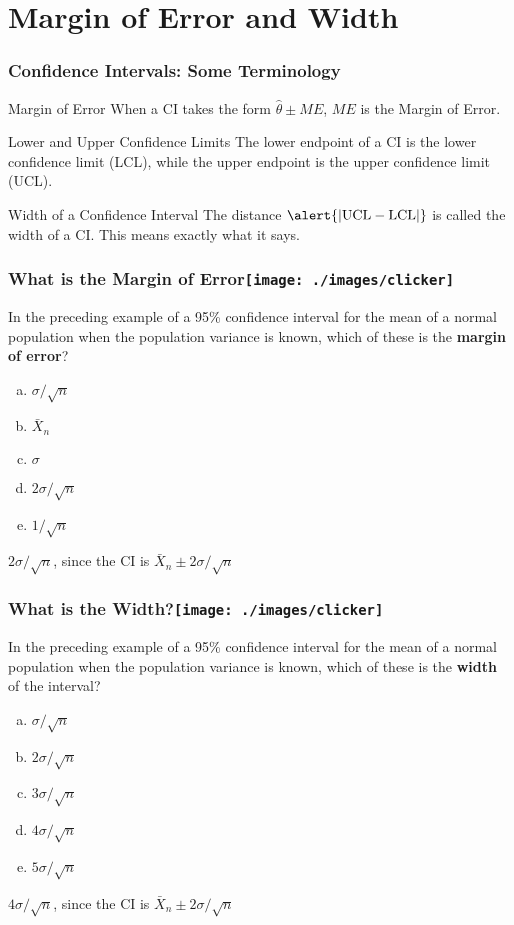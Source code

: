 \section{Margin of Error and Width}
\begin{frame}
\frametitle{Confidence Intervals: Some Terminology}
\begin{block}{Margin of Error}
When a CI takes the form $\widehat{\theta}\pm ME$, $ME$ is the Margin of Error. 
\end{block}
\pause
\begin{block}{Lower and Upper Confidence Limits}
The lower endpoint of a CI is the \alert{lower confidence limit (LCL)}, while the upper endpoint is the \alert{upper confidence limit (UCL)}.
\end{block}
\pause
\begin{block}{Width of a Confidence Interval}
The distance $\alert{|\mbox{UCL} - \mbox{LCL}|}$ is called the \alert{width} of a CI. This means exactly what it says. 
\end{block}

\end{frame}
\begin{frame}
\frametitle{What is the Margin of Error\hfill \texttt{[image: ./images/clicker]}}
In the preceding example of a  95\% confidence interval for the mean of a normal population when the population variance is known, which of these is the \textbf{margin of error}?
	\begin{enumerate}[(a)]
		\item $\sigma/\sqrt{n}$
		\item $\bar{X}_n$
		\item $\sigma$
		\item $2\sigma/\sqrt{n}$
		\item $1/\sqrt{n}$
	\end{enumerate}
\pause
\vspace{1em}
\alert{\large $2\sigma/\sqrt{n}$, since the CI is $\bar{X}_n \pm 2\sigma/\sqrt{n}$}
\end{frame}
\begin{frame}
\frametitle{What is the Width?\hfill \texttt{[image: ./images/clicker]}}
In the preceding example of a  95\% confidence interval for the mean of a normal population when the population variance is known, which of these is the \textbf{width} of the interval?
	\begin{enumerate}[(a)]
		\item $\sigma/\sqrt{n}$
		\item $2\sigma/\sqrt{n}$
		\item $3\sigma/\sqrt{n}$
		\item $4\sigma/\sqrt{n}$
		\item $5\sigma/\sqrt{n}$
	\end{enumerate}
\pause
\vspace{1em}
\alert{\large $4\sigma/\sqrt{n}$, since the CI is $\bar{X}_n \pm 2\sigma/\sqrt{n}$}
\end{frame}
